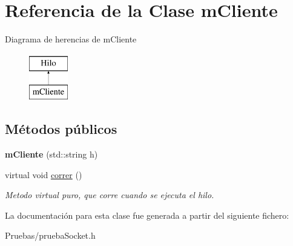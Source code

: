 \hypertarget{classmCliente}{\section{\-Referencia de la \-Clase m\-Cliente}
\label{classmCliente}
}
\-Diagrama de herencias de m\-Cliente\begin{figure}[H]
\begin{center}
\leavevmode
\includegraphics[height=2.000000cm]{classmCliente}
\end{center}
\end{figure}
\subsection*{\-Métodos públicos}
\begin{DoxyCompactItemize}
\item 
\hypertarget{classmCliente_acd61fb56f534263262f630f1899583b6}{{\bfseries m\-Cliente} (std\-::string h)}\label{classmCliente_acd61fb56f534263262f630f1899583b6}

\item 
\hypertarget{classmCliente_aaf850da977663d5596c3fb322b9cf164}{virtual void \hyperlink{classmCliente_aaf850da977663d5596c3fb322b9cf164}{correr} ()}\label{classmCliente_aaf850da977663d5596c3fb322b9cf164}

\begin{DoxyCompactList}\small\item\em \-Metodo virtual puro, que corre cuando se ejecuta el hilo. \end{DoxyCompactList}\end{DoxyCompactItemize}


\-La documentación para esta clase fue generada a partir del siguiente fichero\-:\begin{DoxyCompactItemize}
\item 
\-Pruebas/prueba\-Socket.\-h\end{DoxyCompactItemize}

